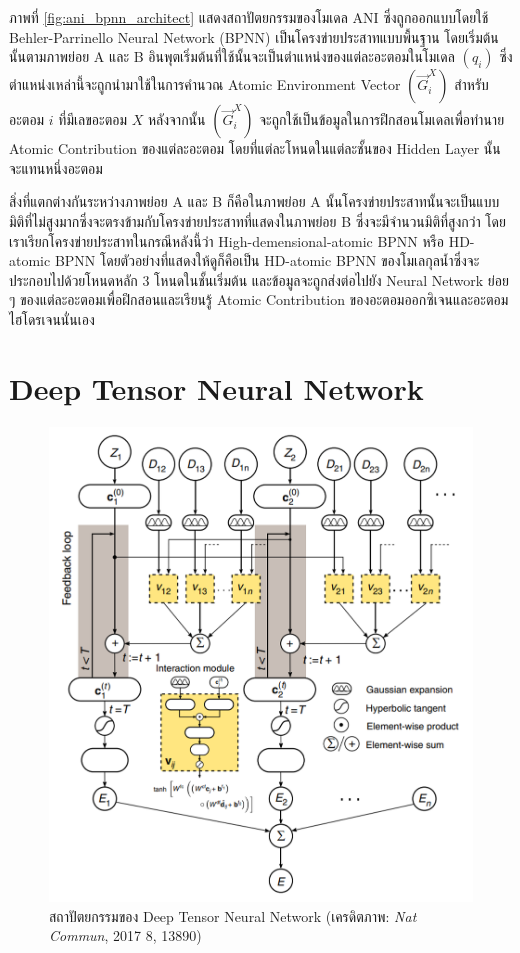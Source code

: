 ภาพที่ \ref{fig:ani_bpnn_architect} แสดงสถาปัตยกรรมของโมเดล ANI ซึ่งถูกออกแบบโดยใช้ Behler-Parrinello Neural Network (BPNN) เป็นโครงข่ายประสาทแบบพื้นฐาน โดยเริ่มต้นนั้นตามภาพย่อย A และ B อินพุตเริ่มต้นที่ใช้นั้นจะเป็นตำแหน่งของแต่ละอะตอมในโมเดล $(q_{i})$ ซึ่งตำแหน่งเหล่านี้จะถูกนำมาใช้ในการคำนวณ Atomic Environment Vector $(\vec{G}^{X}_{i})$ สำหรับอะตอม $i$ ที่มีเลขอะตอม $X$ หลังจากนั้น $(\vec{G}^{X}_{i})$ จะถูกใช้เป็นข้อมูลในการฝึกสอนโมเดลเพื่อทำนาย Atomic Contribution ของแต่ละอะตอม โดยที่แต่ละโหนดในแต่ละชั้นของ Hidden Layer นั้นจะแทนหนึ่งอะตอม

สิ่งที่แตกต่างกันระหว่างภาพย่อย A และ B ก็คือในภาพย่อย A นั้นโครงข่ายประสาทนั้นจะเป็นแบบมิติที่ไม่สูงมากซึ่งจะตรงข้ามกับโครงข่ายประสาทที่แสดงในภาพย่อย B ซึ่งจะมีจำนวนมิติที่สูงกว่า โดยเราเรียกโครงข่ายประสาทในกรณีหลังนี้ว่า High-demensional-atomic BPNN หรือ HD-atomic BPNN โดยตัวอย่างที่แสดงให้ดูก็คือเป็น HD-atomic BPNN ของโมเลกุลน้ำซึ่งจะประกอบไปด้วยโหนดหลัก 3 โหนดในชั้นเริ่มต้น และข้อมูลจะถูกส่งต่อไปยัง Neural Network ย่อย ๆ ของแต่ละอะตอมเพื่อฝึกสอนและเรียนรู้ Atomic Contribution ของอะตอมออกซิเจนและอะตอมไฮโดรเจนนั่นเอง

\section{Deep Tensor Neural Network}
\label{sec:dtnn}

\begin{figure}[H]
    \centering
    \includegraphics[width=0.75\linewidth]{fig/dtnn.png}
    \caption{สถาปัตยกรรมของ Deep Tensor Neural Network (เครดิตภาพ: \textit{Nat Commun}, 2017 8, 13890)}
    \label{fig:dtnn_architect}
\end{figure}

